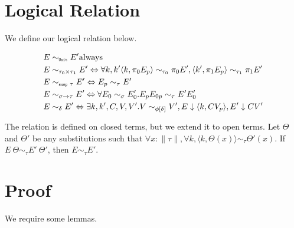 \section*{Logical Relation}
We define our logical relation below.

\begin{align*}
  E &\sim_{\texttt{\tiny{Unit}}} E' \text{always}  \\
  E &\sim_{\tau_0 \times \tau_1} E' \Leftrightarrow \forall k, k' \langle k, \pi_0 E_p\rangle \sim_{\tau_0} \pi_0 E', \langle k', \pi_1 E_p\rangle \sim_{\tau_1} \pi_1 E' \\
  E &\sim_{\texttt{\tiny{susp }} \tau} E' \Leftrightarrow E_p \sim_\tau E' \\
  E &\sim_{\sigma \to \tau} E' \Leftrightarrow \forall E_0 \sim_\sigma E'_0. E_p E_{0p} \sim_\tau E' E'_0 \\
  E &\sim_\delta E' \Leftrightarrow \exists k, k', C, V, V'. V \sim_{\phi[\delta]} V', E \downarrow \langle k, C V_p \rangle, E' \downarrow C V'
\end{align*}

The relation is defined on closed terms, but we extend it to open terms.
Let $\Theta$ and $\Theta'$ be any substitutions such that $\forall x : \|\tau\|, \forall k, \langle k, \Theta(x) \rangle \sim_\tau \Theta'(x)$.
If $E\ \Theta \sim_\tau E'\ \Theta'$, then $E \sim_\tau E'$.

\section*{Proof}

We require some lemmas.

